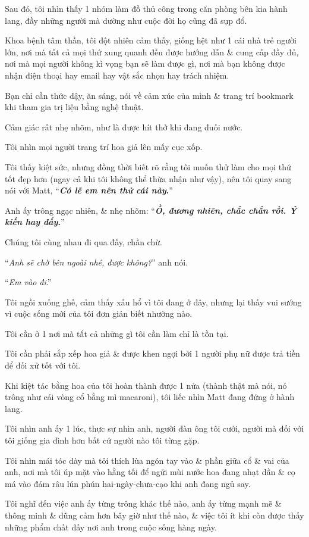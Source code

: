\documentclass{article}
\begin{document}
Sau đó, tôi nhìn thấy 1 nhóm làm đồ thủ công trong căn phòng bên kia hành lang, đầy những người mà dường như cuộc đời họ cũng đã sụp đổ.

%
Khoa bệnh tâm thần, tôi đột nhiên cảm thấy, giống hệt như 1 cái nhà trẻ người lớn, nơi mà tất cả mọi thứ xung quanh đều được hướng dẫn \& cung cấp đầy đủ, nơi mà mọi người không kì vọng bạn sẽ làm được gì, nơi mà bạn không được nhận điện thoại hay email hay vật sắc nhọn hay trách nhiệm.

Bạn chỉ cần thức dậy, ăn sáng, nói về cảm xúc của mình \& trang trí bookmark khi tham gia trị liệu bằng nghệ thuật.

Cảm giác rất nhẹ nhõm, như là được hít thở khi đang đuối nước.

Tôi nhìn mọi người trang trí hoa giả lên mấy cục xốp.

Tôi thấy kiệt sức, nhưng đồng thời biết rõ rằng tôi muốn thử làm cho mọi thứ tốt đẹp hơn (ngay cả khi tôi không thể thừa nhận như vậy), nên tôi quay sang nói với Matt, ``\textbf{\textit{Có lẽ em nên thử cái này}.}''

Anh ấy trông ngạc nhiên, \& nhẹ nhõm: ``\textbf{\textit{Ồ, đương nhiên, chắc chắn rồi. Ý kiến hay đấy}.}''

%
Chúng tôi cùng nhau đi qua đấy, chần chừ.

``\textit{Anh sẽ chờ bên ngoài nhé, được không?}'' anh nói.

``\textit{Em vào đi}.''

Tôi ngồi xuống ghế, cảm thấy xấu hổ vì tôi đang ở đây, nhưng lại thấy vui sướng vì cuộc sống mới của tôi đơn giản biết nhường nào.

Tôi cần ở 1 nơi mà tất cả những gì tôi cần làm chỉ là tồn tại.

Tôi cần phải sắp xếp hoa giả \& được khen ngợi bởi 1 người phụ nữ được trả tiền để đối xử tốt với tôi.

Khi kiệt tác bằng hoa của tôi hoàn thành được 1 nửa (thành thật mà nói, nó trông như cái vòng cổ bằng mì macaroni), tôi liếc nhìn Matt đang đứng ở hành lang.

Tôi nhìn anh ấy 1 lúc, thực sự nhìn anh, người đàn ông tôi cưới, người mà đối với tôi giống gia đình hơn bất cứ người nào tôi từng gặp.

%
Tôi nhìn mái tóc dày mà tôi thích lùa ngón tay vào \& phần giữa cổ \& vai của anh, nơi mà tôi úp mặt vào hằng tối để ngửi mùi nước hoa đang nhạt dần \& cọ má vào đám râu lún phún hai-ngày-chưa-cạo khi anh đang ngủ say.

Tôi nghĩ đến việc anh ấy từng trông khác thế nào, anh ấy từng mạnh mẽ \& thông minh \& dũng cảm hơn bây giờ như thế nào, \& việc tôi ít khi còn được thấy những phẩm chất đấy nơi anh trong cuộc sống hàng ngày.
\end{document}
